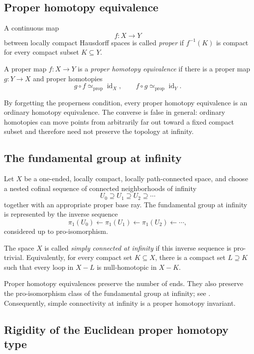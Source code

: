 \documentclass[10pt,reqno]{amsart}
\numberwithin{equation}{section}
\theoremstyle{definition}
\theoremstyle{remark}
\begin{document}
\subsection{Proper homotopy equivalence}

A continuous map
\[
f\colon X\longrightarrow Y
\]
between locally compact Hausdorff spaces is called \emph{proper} if
\(f^{-1}(K)\) is compact for every compact subset \(K\subseteq Y\).

A proper map \(f\colon X\to Y\) is a \emph{proper homotopy
equivalence} if there is a proper map \(g\colon Y\to X\) and proper
homotopies
\[
g\circ f\simeq_{\mathrm{prop}}\operatorname{id}_X,
\qquad
f\circ g\simeq_{\mathrm{prop}}\operatorname{id}_Y.
\]

By forgetting the properness condition, every proper homotopy
equivalence is an ordinary homotopy equivalence.  The converse is
false in general: ordinary homotopies can move points from arbitrarily
far out toward a fixed compact subset and therefore need not preserve
the topology at infinity.

\subsection{The fundamental group at infinity}

Let \(X\) be a one-ended, locally compact, locally path-connected
space, and choose a nested cofinal sequence of connected neighborhoods
of infinity
\[
U_0\supseteq U_1\supseteq U_2\supseteq\cdots
\]
together with an appropriate proper base ray.  The fundamental group
at infinity is represented by the inverse sequence
\[
\pi_1(U_0)
\longleftarrow
\pi_1(U_1)
\longleftarrow
\pi_1(U_2)
\longleftarrow\cdots,
\]
considered up to pro-isomorphism.

The space \(X\) is called \emph{simply connected at infinity} if this
inverse sequence is pro-trivial.  Equivalently, for every compact set
\(K\subseteq X\), there is a compact set \(L\supseteq K\) such that
every loop in \(X-L\) is null-homotopic in \(X-K\).

Proper homotopy equivalences preserve the number of ends.  They also
preserve the pro-isomorphism class of the fundamental group at
infinity; see \cite{GuilbaultEnds}.  Consequently, simple connectivity
at infinity is a proper homotopy invariant.

\subsection{Rigidity of the Euclidean proper homotopy type}
\end{document}
